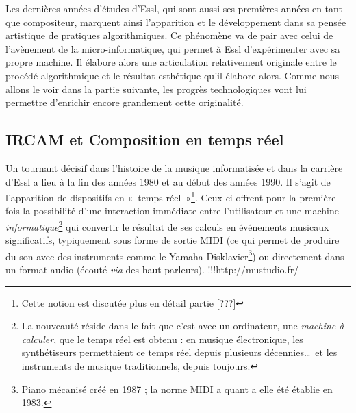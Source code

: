 \documentclass[a4paper,12pt]{article}
\newcommand{\guill}[1]{«~#1~»}
\begin{document}

Les dernières années d'études d'Essl, qui sont aussi ses premières années en tant que compositeur, marquent ainsi l'apparition et le développement dans sa pensée artistique de pratiques algorithmiques. Ce phénomène va de pair avec celui de l'avènement de la micro-informatique, qui permet à Essl d'expérimenter avec sa propre machine. Il élabore alors une articulation relativement originale entre le procédé algorithmique et le résultat esthétique qu'il élabore alors. Comme nous allons le voir dans la partie suivante, les progrès technologiques vont lui permettre d'enrichir encore grandement cette originalité.

\subsection{IRCAM et Composition en temps réel}
\label{ircam}

Un tournant décisif dans l'histoire de la musique informatisée et dans la carrière d'Essl a lieu à la fin des années 1980 et au début des années 1990. Il s'agit de l'apparition de dispositifs en \guill{temps réel}\footnote{Cette notion est discutée plus en détail partie \ref{???}}. Ceux-ci offrent pour la première fois la possibilité d'une interaction immédiate entre l'utilisateur et une machine \emph{informatique}\footnote{La nouveauté réside dans le fait que c'est avec un ordinateur, une \emph{machine à calculer}, que le temps réel est obtenu : en musique électronique, les synthétiseurs permettaient ce temps réel depuis plusieurs décennies\dots~et les instruments de musique traditionnels, depuis toujours.} qui convertir le résultat de ses calculs en événements musicaux significatifs, typiquement sous forme de sortie MIDI (ce qui permet de produire du son avec des instruments comme le Yamaha Disklavier\footnote{Piano mécanisé créé en 1987 ; la norme MIDI a quant a elle été établie en 1983.}) ou directement dans un format audio (écouté \emph{via} des haut-parleurs). !!!http://mustudio.fr/
\end{document}
